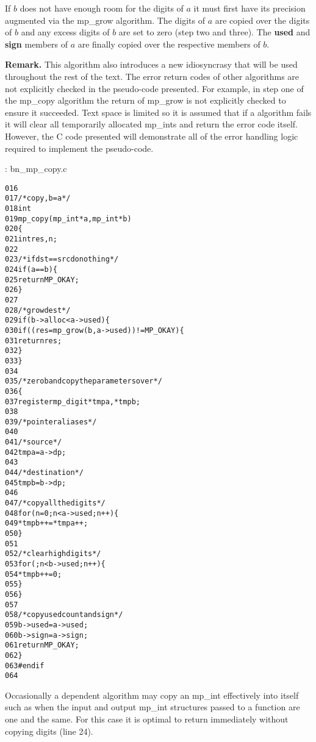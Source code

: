 \documentclass[b5paper]{book}
\begin{document}
If $b$ does not have enough room for the digits of $a$ it must first have its precision augmented via the mp\_grow 
algorithm.  The digits of $a$ are copied over the digits of $b$ and any excess digits of $b$ are set to zero (step two
and three).  The \textbf{used} and \textbf{sign} members of $a$ are finally copied over the respective members of
$b$.

\textbf{Remark.}  This algorithm also introduces a new idiosyncrasy that will be used throughout the rest of the
text.  The error return codes of other algorithms are not explicitly checked in the pseudo-code presented.  For example, in 
step one of the mp\_copy algorithm the return of mp\_grow is not explicitly checked to ensure it succeeded.  Text space is 
limited so it is assumed that if a algorithm fails it will clear all temporarily allocated mp\_ints and return
the error code itself.  However, the C code presented will demonstrate all of the error handling logic required to 
implement the pseudo-code.

\vspace{+3mm}\begin{small}
\hspace{-5.1mm}{\bf File}: bn\_mp\_copy.c
\vspace{-3mm}
\begin{alltt}
016   
017   /* copy, b = a */
018   int
019   mp_copy (mp_int * a, mp_int * b)
020   \{
021     int     res, n;
022   
023     /* if dst == src do nothing */
024     if (a == b) \{
025       return MP_OKAY;
026     \}
027   
028     /* grow dest */
029     if (b->alloc < a->used) \{
030        if ((res = mp_grow (b, a->used)) != MP_OKAY) \{
031           return res;
032        \}
033     \}
034   
035     /* zero b and copy the parameters over */
036     \{
037       register mp_digit *tmpa, *tmpb;
038   
039       /* pointer aliases */
040   
041       /* source */
042       tmpa = a->dp;
043   
044       /* destination */
045       tmpb = b->dp;
046   
047       /* copy all the digits */
048       for (n = 0; n < a->used; n++) \{
049         *tmpb++ = *tmpa++;
050       \}
051   
052       /* clear high digits */
053       for (; n < b->used; n++) \{
054         *tmpb++ = 0;
055       \}
056     \}
057   
058     /* copy used count and sign */
059     b->used = a->used;
060     b->sign = a->sign;
061     return MP_OKAY;
062   \}
063   #endif
064   
\end{alltt}
\end{small}

Occasionally a dependent algorithm may copy an mp\_int effectively into itself such as when the input and output
mp\_int structures passed to a function are one and the same.  For this case it is optimal to return immediately without 
copying digits (line 24).  
\end{document}
